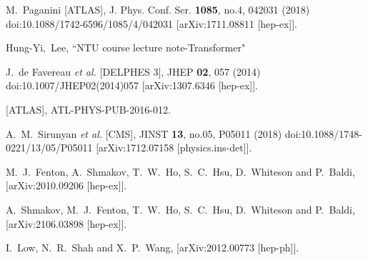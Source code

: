 \begin{thebibliography}{99}
M.~Paganini [ATLAS],
J. Phys. Conf. Ser. \textbf{1085}, no.4, 042031 (2018)
doi:10.1088/1742-6596/1085/4/042031
[arXiv:1711.08811 [hep-ex]].

Hung-Yi,~Lee,
``NTU course lecture note-Transformer"

J.~de Favereau \textit{et al.} [DELPHES 3],
JHEP \textbf{02}, 057 (2014)
doi:10.1007/JHEP02(2014)057
[arXiv:1307.6346 [hep-ex]].

[ATLAS],
ATL-PHYS-PUB-2016-012.

A.~M.~Sirunyan \textit{et al.} [CMS],
JINST \textbf{13}, no.05, P05011 (2018)
doi:10.1088/1748-0221/13/05/P05011
[arXiv:1712.07158 [physics.ins-det]].

M.~J.~Fenton, A.~Shmakov, T.~W.~Ho, S.~C.~Hsu, D.~Whiteson and P.~Baldi,
[arXiv:2010.09206 [hep-ex]].

A.~Shmakov, M.~J.~Fenton, T.~W.~Ho, S.~C.~Hsu, D.~Whiteson and P.~Baldi,
[arXiv:2106.03898 [hep-ex]].

I.~Low, N.~R.~Shah and X.~P.~Wang,
[arXiv:2012.00773 [hep-ph]].

\end{thebibliography}
\newpage
